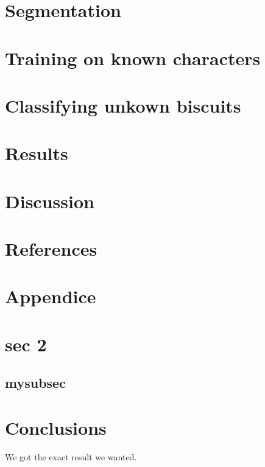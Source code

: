 \documentclass[a4paper,11pt]{article}
\begin{document}
\section{Segmentation}

\section{Training on known characters}
\section{Classifying unkown biscuits}
\section{Results}
\section{Discussion}
\section{References}
\section{Appendice}
\section{sec 2}

\subsection{mysubsec}
\section{Conclusions}
We got the exact result we wanted.
\end{document}
